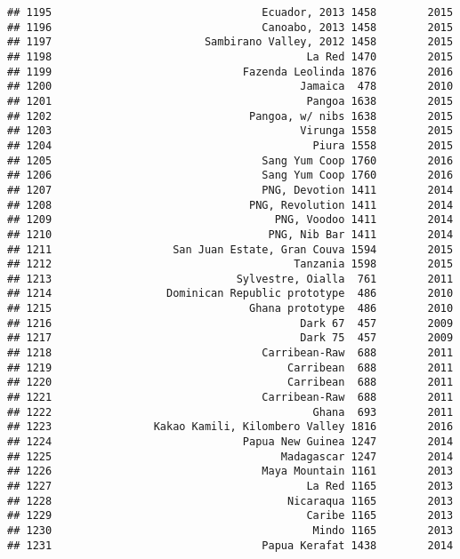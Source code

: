 \documentclass[
]{article}
\begin{document}
\begin{verbatim}
## 1195                                 Ecuador, 2013 1458        2015
## 1196                                 Canoabo, 2013 1458        2015
## 1197                        Sambirano Valley, 2012 1458        2015
## 1198                                        La Red 1470        2015
## 1199                              Fazenda Leolinda 1876        2016
## 1200                                       Jamaica  478        2010
## 1201                                        Pangoa 1638        2015
## 1202                               Pangoa, w/ nibs 1638        2015
## 1203                                       Virunga 1558        2015
## 1204                                         Piura 1558        2015
## 1205                                 Sang Yum Coop 1760        2016
## 1206                                 Sang Yum Coop 1760        2016
## 1207                                 PNG, Devotion 1411        2014
## 1208                               PNG, Revolution 1411        2014
## 1209                                   PNG, Voodoo 1411        2014
## 1210                                  PNG, Nib Bar 1411        2014
## 1211                   San Juan Estate, Gran Couva 1594        2015
## 1212                                      Tanzania 1598        2015
## 1213                             Sylvestre, Oialla  761        2011
## 1214                  Dominican Republic prototype  486        2010
## 1215                               Ghana prototype  486        2010
## 1216                                       Dark 67  457        2009
## 1217                                       Dark 75  457        2009
## 1218                                 Carribean-Raw  688        2011
## 1219                                     Carribean  688        2011
## 1220                                     Carribean  688        2011
## 1221                                 Carribean-Raw  688        2011
## 1222                                         Ghana  693        2011
## 1223                Kakao Kamili, Kilombero Valley 1816        2016
## 1224                              Papua New Guinea 1247        2014
## 1225                                    Madagascar 1247        2014
## 1226                                 Maya Mountain 1161        2013
## 1227                                        La Red 1165        2013
## 1228                                     Nicaraqua 1165        2013
## 1229                                        Caribe 1165        2013
## 1230                                         Mindo 1165        2013
## 1231                                 Papua Kerafat 1438        2014

\end{verbatim}
\end{document}
